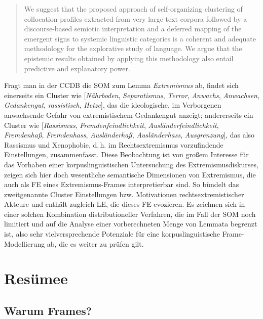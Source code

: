 \begin{quote}
We suggest that the proposed approach of self-organizing clustering of collocation profiles extracted from very large text corpora followed by a discourse-based semiotic interpretation and a deferred mapping of the emergent signs to systemic linguistic categories is a coherent and adequate methodology for the explorative study of language. We argue that the epistemic results obtained by applying this methodology also entail predictive and explanatory power. \autocite[238-239]{vachkovaSelfOrganizingLexicalFeature2008}
\end{quote}

Fragt man in der CCDB die SOM zum Lemma \emph{Extremismus} ab, findet sich einerseits ein Cluster wie {[}\emph{Nährboden}, \emph{Separatismus}, \emph{Terror}, \emph{Anwachs}, \emph{Anwachsen}, \emph{Gedankengut}, \emph{rassistisch}, \emph{Hetze}{]}, das die ideologische, im Verborgenen anwachsende Gefahr von extremistischem Gedankengut anzeigt; andererseits ein Cluster wie {[}\emph{Rassismus}, \emph{Fremdenfeindlichkeit}, \emph{Ausländerfeindlichkeit}, \emph{Fremdenhaß}, \emph{Fremdenhass}, \emph{Ausländerhaß}, \emph{Ausländerhass}, \emph{Ausgrenzung}{]}, das also Rassismus und Xenophobie, d.\,h. im Rechtsextremismus vorzufindende Einstellungen, zusammenfasst. Diese Beobachtung ist von großem Interesse für das Vorhaben einer korpuslinguistischen Untersuchung des Extremismusdiskurses, zeigen sich hier doch wesentliche semantische Dimensionen von Extremismus, die auch als FE eines Extremismus-Frames interpretierbar sind. So bündelt das zweitgenannte Cluster Einstellungen bzw. Motivationen rechtsextremistischer Akteure und enthält zugleich LE, die dieses FE evozieren. Es zeichnen sich in einer solchen Kombination distributioneller Verfahren, die im Fall der SOM noch limitiert und auf die Analyse einer vorberechneten Menge von Lemmata begrenzt ist, also sehr vielversprechende Potenziale für eine korpuslinguistische Frame-Modellierung ab, die es weiter zu prüfen gilt.

\section{Resümee}\label{resuemee}

\subsection{Warum Frames?}\label{warum-frames}


